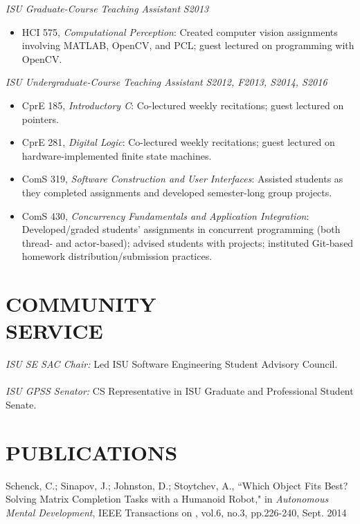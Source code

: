 \documentclass[margin, 10pt]{res} %
\begin{document}
\begin{resume}
{\sl ISU Graduate-Course Teaching Assistant}         \hfill {\sl S2013}
  \begin{itemize} \itemsep -1pt
    \item HCI 575, {\sl Computational Perception}: Created computer vision
          assignments involving MATLAB, OpenCV, and PCL; guest lectured on
          programming with OpenCV.
  \end{itemize}

{\sl ISU Undergraduate-Course Teaching Assistant}    \hfill {\sl S2012, F2013,
                                                            S2014, S2016}
  \begin{itemize} \itemsep -1pt
    \item CprE 185, {\sl Introductory C}: Co-lectured weekly recitations; guest
          lectured on pointers.
    \item CprE 281, {\sl Digital Logic}: Co-lectured weekly recitations; guest
          lectured on hardware-implemented finite state machines.
    \item ComS 319, {\sl Software Construction and User Interfaces}: Assisted
          students as they completed assignments and developed semester-long
          group projects.
    \item ComS 430, {\sl Concurrency Fundamentals and Application Integration}:
          Developed/graded students' assignments in concurrent programming
          (both thread- and actor-based); advised students with projects;
          instituted Git-based homework distribution/submission practices.
  \end{itemize}



\section{COMMUNITY \\ SERVICE}
{\sl ISU SE SAC Chair:} Led ISU Software Engineering Student Advisory
Council. \\
\\
{\sl ISU GPSS Senator:} CS Representative in ISU Graduate and Professional
Student Senate.


\section{PUBLICATIONS}

Schenck, C.; Sinapov, J.; Johnston, D.; Stoytchev, A., ``Which Object Fits Best?
Solving Matrix Completion Tasks with a Humanoid Robot," in {\sl Autonomous
Mental Development}, IEEE Transactions on , vol.6, no.3, pp.226-240, Sept. 2014

\end{resume}
\end{document}

